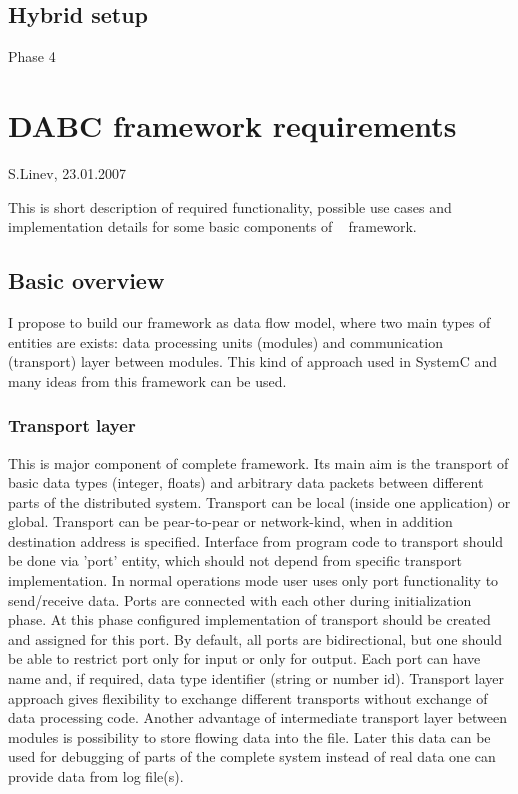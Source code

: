 \subsection{Hybrid setup}
Phase 4
\section{DABC framework requirements}

S.Linev, 23.01.2007

This is short description of required functionality, possible use cases and implementation details for some basic components of \dabc~ framework.

\subsection{Basic overview}
I propose to build our framework as data flow model, where two main types of entities are exists: data processing units (modules) and communication (transport) layer between modules. This kind of approach used in SystemC and many ideas from this framework can be used.

\subsubsection{Transport layer}
This is major component of complete framework. Its main aim is the transport of basic data types (integer, floats) and arbitrary data packets between different parts of the distributed system. Transport can be local (inside one application) or global. Transport can be pear-to-pear or network-kind, when in addition destination address is specified. 
Interface from program code to transport should be done via 'port' entity, which should not depend from specific transport implementation. In normal operations mode user uses only port functionality to send/receive data. 
Ports are connected with each other during initialization phase. At this phase configured implementation of transport should be created and assigned for this port. 
By default, all ports are bidirectional, but one should be able to restrict port only for input or only for output. Each port can have name and, if required, data type identifier (string or number id). 
Transport layer approach gives flexibility to exchange different transports without exchange of data processing code.
Another advantage of intermediate transport layer between modules is possibility to store flowing data into the file. Later this data can be used for debugging of parts of the complete system instead of real data one can provide data from log file(s). 

